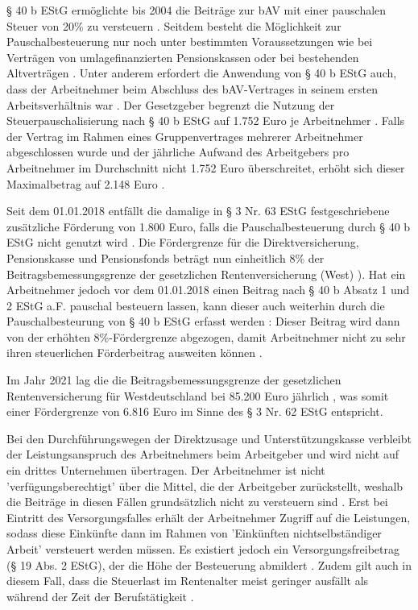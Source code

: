§ 40 b EStG ermöglichte bis 2004 die Beiträge zur bAV mit einer pauschalen Steuer von 20\% zu versteuern \cite[S. 113]{buttler2017einfuehrung}. Seitdem besteht die Möglichkeit zur Pauschalbesteuerung nur noch unter bestimmten Voraussetzungen wie bei Verträgen von umlagefinanzierten Pensionskassen oder bei bestehenden Altverträgen \cite[S. 113]{buttler2017einfuehrung}. Unter anderem erfordert die Anwendung von § 40 b EStG auch, dass der Arbeitnehmer beim Abschluss des bAV-Vertrages in seinem ersten Arbeitsverhältnis war \cite[S. 116]{buttler2017einfuehrung}. Der Gesetzgeber begrenzt die Nutzung der Steuerpauschalisierung nach § 40 b EStG auf 1.752 Euro je Arbeitnehmer \cite[S. 116]{buttler2017einfuehrung}. Falls der Vertrag im Rahmen eines Gruppenvertrages mehrerer Arbeitnehmer abgeschlossen wurde und der jährliche Aufwand des Arbeitgebers pro Arbeitnehmer im Durchschnitt nicht 1.752 Euro überschreitet, erhöht sich dieser Maximalbetrag auf 2.148 Euro \cite[S. 117]{buttler2017einfuehrung}.

Seit dem 01.01.2018 entfällt die damalige in § 3 Nr. 63 EStG festgeschriebene zusätzliche Förderung von 1.800 Euro, falls die Pauschalbesteuerung durch § 40 b EStG nicht genutzt wird \cite[S. 111]{buttler2017einfuehrung}. Die Fördergrenze für die Direktversicherung, Pensionskasse und Pensionsfonds beträgt nun einheitlich 8\% der Beitragsbemessungsgrenze der gesetzlichen Rentenversicherung (West) \cite[S. 111]{buttler2017einfuehrung}). Hat ein Arbeitnehmer jedoch vor dem 01.01.2018 einen Beitrag nach § 40 b Absatz 1 und 2 EStG a.F. pauschal besteuern lassen, kann dieser auch weiterhin durch die Pauschalbesteurung von § 40 b EStG erfasst werden \cite[S. 114 f.]{buttler2017einfuehrung}: Dieser Beitrag wird dann von der erhöhten 8\%-Fördergrenze abgezogen, damit Arbeitnehmer nicht zu sehr ihren steuerlichen Förderbeitrag ausweiten können \cite[S. 111]{buttler2017einfuehrung}. 

Im Jahr 2021 lag die die Beitragsbemessungsgrenze der gesetzlichen Rentenversicherung für Westdeutschland bei 85.200 Euro jährlich \cite{bbg2021}, was somit einer Fördergrenze von 6.816 Euro im Sinne des § 3 Nr. 62 EStG entspricht.

Bei den Durchführungswegen der Direktzusage und Unterstützungskasse verbleibt der Leistungsanspruch des Arbeitnehmers beim Arbeitgeber und wird nicht auf ein drittes Unternehmen übertragen. Der Arbeitnehmer ist nicht 'verfügungsberechtigt' \cite[S. 137]{buttler2017einfuehrung} über die Mittel, die der Arbeitgeber zurückstellt, weshalb die Beiträge in diesen Fällen grundsätzlich nicht zu versteuern sind \cite[S. 138]{buttler2017einfuehrung}. Erst bei Eintritt des Versorgungsfalles erhält der Arbeitnehmer Zugriff auf die Leistungen, sodass diese Einkünfte dann im Rahmen von 'Einkünften nichtselbständiger Arbeit' \cite[S. 138]{buttler2017einfuehrung} versteuert werden müssen. Es existiert jedoch ein Versorgungsfreibetrag (§ 19 Abs. 2 EStG), der die Höhe der Besteuerung abmildert \cite[S. 138]{buttler2017einfuehrung}. Zudem gilt auch in diesem Fall, dass die Steuerlast im Rentenalter meist geringer ausfällt als während der Zeit der Berufstätigkeit \cite{verbraucherzentrale}.

